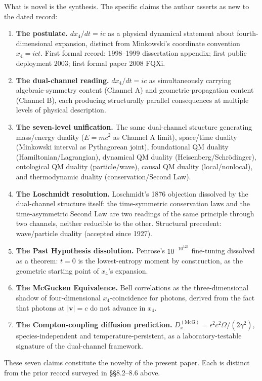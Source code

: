 \documentclass[11pt,a4paper]{article}
\begin{document}
What is novel is the synthesis. The specific claims the author asserts as new to the dated record:

\begin{enumerate}
\item \textbf{The postulate.} $dx_4/dt = ic$ as a physical dynamical statement about fourth-dimensional expansion, distinct from Minkowski's coordinate convention $x_4 = ict$. First formal record: 1998--1999 dissertation appendix; first public deployment 2003; first formal paper 2008 FQXi.
\item \textbf{The dual-channel reading.} $dx_4/dt = ic$ as simultaneously carrying algebraic-symmetry content (Channel A) and geometric-propagation content (Channel B), each producing structurally parallel consequences at multiple levels of physical description.
\item \textbf{The seven-level unification.} The same dual-channel structure generating mass/energy duality ($E = mc^2$ as Channel A limit), space/time duality (Minkowski interval as Pythagorean joint), foundational QM duality (Hamiltonian/Lagrangian), dynamical QM duality (Heisenberg/Schr\"odinger), ontological QM duality (particle/wave), causal QM duality (local/nonlocal), and thermodynamic duality (conservation/Second Law).
\item \textbf{The Loschmidt resolution.} Loschmidt's 1876 objection dissolved by the dual-channel structure itself: the time-symmetric conservation laws and the time-asymmetric Second Law are two readings of the same principle through two channels, neither reducible to the other. Structural precedent: wave/particle duality (accepted since 1927).
\item \textbf{The Past Hypothesis dissolution.} Penrose's $10^{-10^{123}}$ fine-tuning dissolved as a theorem: $t = 0$ is the lowest-entropy moment by construction, as the geometric starting point of $x_4$'s expansion.
\item \textbf{The McGucken Equivalence.} Bell correlations as the three-dimensional shadow of four-dimensional $x_4$-coincidence for photons, derived from the fact that photons at $|\mathbf{v}| = c$ do not advance in $x_4$.
\item \textbf{The Compton-coupling diffusion prediction.} $D_x^{(\text{McG})} = \epsilon^2 c^2 \Omega / (2\gamma^2)$, species-independent and temperature-persistent, as a laboratory-testable signature of the dual-channel framework.
\end{enumerate}

These seven claims constitute the novelty of the present paper. Each is distinct from the prior record surveyed in \S\S8.2--8.6 above.
\end{document}
